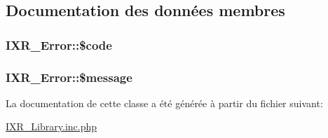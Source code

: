 \subsection{Documentation des donn\'{e}es membres}
\hypertarget{classIXR__Error_o0}{
\subsubsection[\$code]{\setlength{\rightskip}{0pt plus 5cm}IXR\_\-Error::\$code}}
\label{classIXR__Error_o0}


\hypertarget{classIXR__Error_o1}{
\subsubsection[\$message]{\setlength{\rightskip}{0pt plus 5cm}IXR\_\-Error::\$message}}
\label{classIXR__Error_o1}




La documentation de cette classe a \'{e}t\'{e} g\'{e}n\'{e}r\'{e}e \`{a} partir du fichier suivant:\begin{CompactItemize}
\item 
\hyperlink{IXR__Library_8inc_8php}{IXR\_\-Library.inc.php}\end{CompactItemize}
